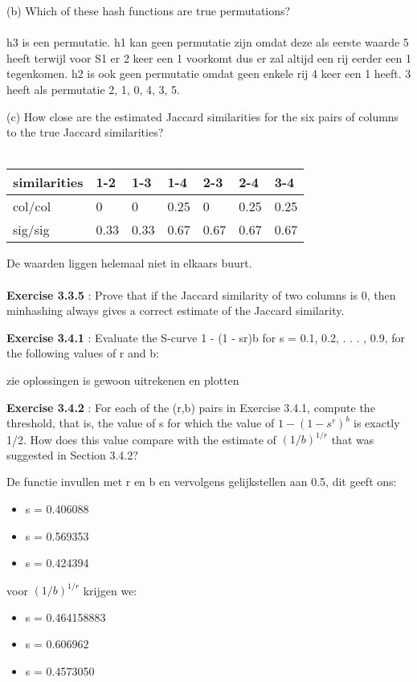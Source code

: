 \documentclass{exam}
\begin{document}
\begin{questions}
(b) Which of these hash functions are true permutations?\\\\
 h3 is een permutatie. h1 kan geen permutatie zijn omdat deze als eerste waarde 5 heeft terwijl voor S1 er 2 keer een 1 voorkomt dus er zal altijd een rij eerder een 1 tegenkomen. h2 is ook geen permutatie omdat geen enkele rij 4 keer een 1 heeft. 3 heeft als permutatie 2, 1, 0, 4, 3, 5.

(c) How close are the estimated Jaccard similarities for the six pairs of columns to the true Jaccard similarities?\\\\

\begin{center}
    \begin{tabular}{| l | l | l | l | l | l | l |}
    \hline
	 similarities & 1-2 & 1-3 & 1-4 & 2-3 & 2-4 & 3-4  \\ \hline
     col/col & 0 & 0 & 0.25 & 0 & 0.25 & 0.25 \\ \hline
     sig/sig & 0.33 & 0.33 & 0.67 & 0.67 & 0.67 & 0.67 \\ \hline
    \end{tabular}
\end{center}
De waarden liggen helemaal niet in elkaars buurt.\\\\

\question \textbf{Exercise 3.3.5} : Prove that if the Jaccard similarity of two columns is 0, then minhashing always gives a correct estimate of the Jaccard similarity.

\question \textbf{Exercise 3.4.1} : Evaluate the S-curve 1 - (1 - sr)b for s = 0.1, 0.2, . . . , 0.9, for the following values of r and b:

zie oplossingen is gewoon uitrekenen en plotten

\question \textbf{Exercise 3.4.2} : For each of the (r,b) pairs in Exercise 3.4.1, compute the threshold, that is, the value of s for which the value of $1-(1-s^r)^b$ is exactly 1/2. How does this value compare with the estimate of $(1/b)^{1/r}$ that was suggested in Section 3.4.2?

De functie invullen met r en b en vervolgens gelijkstellen aan 0.5, dit geeft ons:
\begin{itemize}
\item s = 0.406088
\item s = 0.569353
\item s = 0.424394
\end{itemize}

 voor $(1/b)^{1/r}$ krijgen we:
 \begin{itemize}
\item s = 0.464158883
\item s = 0.606962
\item s = 0.4573050
\end{itemize}

\end{questions}
\end{document}
